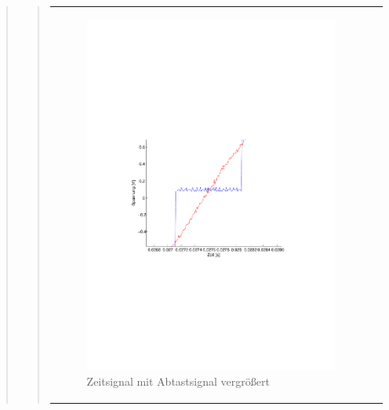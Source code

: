 \begin{quote}
\begin{quote}
        \vspace{2em} 
        
        \begin{center}
        \begin{tabular}{ll}
        
        \hspace{-4cm}
            \begin{minipage}{0.6\textwidth}
                \begin{figure}[H]
                    \includegraphics[scale=0.67, trim = 33mm 95mm 16mm 80mm, clip]{Bilder/Abtastpuls_minus_Kennlinie}
                    \caption{Zeitsignal mit Abtastsignal vergrößert}
                     \label{fig:ein_puls_mit_originalsignal}
                \end{figure}
            \end{minipage}
           

\end{tabular}
\end{center}
\end{quote}
\end{quote}
